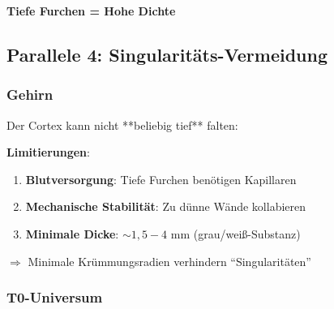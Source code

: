 	\begin{keyresult}
		\textbf{Tiefe Furchen = Hohe Dichte}
		
		\vspace{0.3cm}
		
		\begin{center}
		\end{center}
	\end{keyresult}
	
	\subsection{Parallele 4: Singularitäts-Vermeidung}
	
	\subsubsection{Gehirn}
	
	Der Cortex kann nicht **beliebig tief** falten:
	
	\textbf{Limitierungen}:
	\begin{enumerate}
		\item \textbf{Blutversorgung}: Tiefe Furchen benötigen Kapillaren
		\item \textbf{Mechanische Stabilität}: Zu dünne Wände kollabieren
		\item \textbf{Minimale Dicke}: $\sim 1,5 - 4$ mm (grau/weiß-Substanz)
	\end{enumerate}
	
	$\Rightarrow$ Minimale Krümmungsradien verhindern \enquote{Singularitäten}
	
	\subsubsection{T0-Universum}
	
